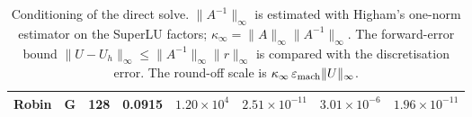 \begin{table}[htbp]
\begin{tabular}{llrrrrrr}
Robin & G & 128 & 0.0915 & $1.20\times10^{4}$ & $2.51\times10^{-11}$ & $3.01\times10^{-6}$ & $1.96\times10^{-11}$ \\
\bottomrule
\end{tabular}
\caption{Conditioning of the direct solve. $\|A^{-1}\|_\infty$ is estimated with Higham's one-norm estimator on the SuperLU factors; $\kappa_\infty=\|A\|_\infty\|A^{-1}\|_\infty$. The forward-error bound $\|U-U_h\|_\infty\le\|A^{-1}\|_\infty\|r\|_\infty$ is compared with the discretisation error. The round-off scale is $\kappa_\infty\,\varepsilon_{\rm mach}\|U\|_\infty$.}
\label{tab:condition}
\end{table}
